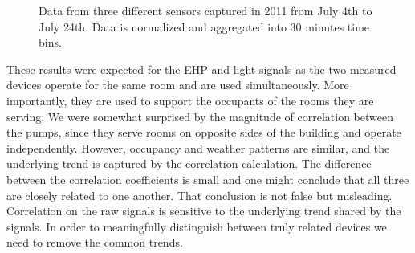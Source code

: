 \begin{figure}
\centering
 \caption{Data from three different sensors captured in 2011 from July 4th to July 24th. Data is normalized and aggregated into 30 minutes time bins.}
 \label{fig:raw}
\end{figure}



These results were expected for the EHP and light signals as the two measured devices operate for the same room 
and are used simultaneously.  More importantly, they are used to support the occupants of the rooms they are serving.
We were somewhat surprised by the magnitude of correlation between the pumps, since they serve rooms on
opposite sides of the building and operate independently.  However, occupancy and weather patterns are similar,
and the underlying trend is captured by the correlation calculation.
The difference between the correlation coefficients is small and one might conclude that all three are
closely related to one another.  That conclusion is not false but misleading.  Correlation on the raw 
signals is sensitive to the underlying trend shared by the signals.  In order to meaningfully distinguish between
truly related devices we need to remove the common trends.  


